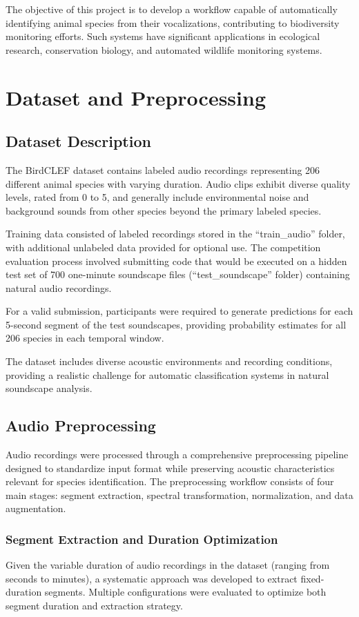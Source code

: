 \documentclass[ERTS, 2025]{ERTS}
\begin{document}
The objective of this project is to develop a workflow capable of automatically identifying animal species from their vocalizations, contributing to biodiversity monitoring efforts. Such systems have significant applications in ecological research, conservation biology, and automated wildlife monitoring systems.

\section{Dataset and Preprocessing}
\subsection{Dataset Description}
The BirdCLEF dataset contains labeled audio recordings representing 206 different animal species with varying duration. Audio clips exhibit diverse quality levels, rated from 0 to 5, and generally include environmental noise and background sounds from other species beyond the primary labeled species.

Training data consisted of labeled recordings stored in the ``train\_audio'' folder, with additional unlabeled data provided for optional use. The competition evaluation process involved submitting code that would be executed on a hidden test set of 700 one-minute soundscape files (``test\_soundscape'' folder) containing natural audio recordings.

For a valid submission, participants were required to generate predictions for each 5-second segment of the test soundscapes, providing probability estimates for all 206 species in each temporal window.

The dataset includes diverse acoustic environments and recording conditions, providing a realistic challenge for automatic classification systems in natural soundscape analysis.

\subsection{Audio Preprocessing}
Audio recordings were processed through a comprehensive preprocessing pipeline designed to standardize input format while preserving acoustic characteristics relevant for species identification. The preprocessing workflow consists of four main stages: segment extraction, spectral transformation, normalization, and data augmentation.

\subsubsection{Segment Extraction and Duration Optimization}
Given the variable duration of audio recordings in the dataset (ranging from seconds to minutes), a systematic approach was developed to extract fixed-duration segments. Multiple configurations were evaluated to optimize both segment duration and extraction strategy.
\end{document}

